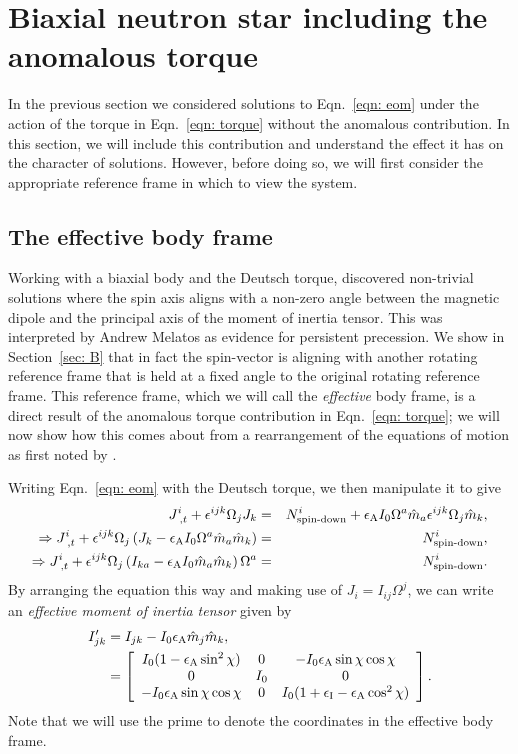 \documentclass[../full_thesis/full_thesis.tex]{subfiles}
\begin{document}
\section{Biaxial neutron star including the anomalous torque}
\label{sec: biaxial neutron star with anomalous torque}
In the previous section we considered solutions to Eqn.~\eqref{eqn: eom}
under the action of the torque in Eqn.~\eqref{eqn: torque} without the
anomalous contribution. In this section, we will include this contribution and
understand the effect it has on the character of solutions. However, before
doing so, we will first consider the appropriate reference frame in which to
view the system.

\subsection{The effective body frame}
\label{sec: effective body frame}
Working with a biaxial body and the Deutsch torque, \cite{Melatos2000}
discovered non-trivial solutions where the spin axis aligns with a non-zero
angle between the magnetic dipole and the principal axis of the moment of
inertia tensor.  This was
interpreted by Andrew Melatos as evidence for persistent precession. We show in
Section~\ref{sec: B} that in fact the spin-vector is aligning with another
rotating reference frame that is held at a fixed angle to the original rotating
reference frame. This reference frame, which we will call the \emph{effective} body
frame, is a direct result of the anomalous torque contribution in
Eqn.~\eqref{eqn: torque}; we will now show how this comes about from a
rearrangement of the equations of motion as first noted by \citet{Glampedakis2010}.

Writing Eqn.~\eqref{eqn: eom} with the Deutsch torque, we then manipulate it to
give
\begin{eqnarray}
J^{i}_{\;,t}+\epsilon^{ijk}\Omega_{j}J_{k} & =
& N^{i}_{\textrm{spin-down}}+
\epsilon_{\mathrm{A}} I_{0}\Omega^{a}\hat{m}_{a}\epsilon^{ijk}\Omega_{j}\hat{m}_{k}, \\
\Rightarrow J^{i}_{\;,t}+
\epsilon^{ijk}\Omega_{j}\left(J_{k}-\epsilon_{\mathrm{A}} I_{0}\Omega^{a}\hat{m}_{a}\hat{m}_{k}\right)
& = & N^{i}_{\textrm{spin-down}}, \\
\Rightarrow J^{i}_{\;,t}+
\epsilon^{ijk}\Omega_{j}\left(I_{ka}-\epsilon_{\mathrm{A}} I_{0}\hat{m}_{a}\hat{m}_{k}\right)\Omega^{a}
& = & N^{i}_{\textrm{spin-down}}.
\end{eqnarray}
By arranging the equation this way and making use of $J_{i}=I_{ij}\Omega^{j}$,
we can write an \emph{effective moment of inertia tensor} given by
\begin{align}
I'_{jk}&=I_{jk}-I_{0}\epsilon_{\mathrm{A}}\hat{m}_{j}\hat{m}_{k}, \\
&= \left[
\begin{array}{ccc}
I_{0}(1-\epsilon_{\mathrm{A}}\sin^{2}\chi) & 0 & -I_{0}\epsilon_{\mathrm{A}}\sin\chi \cos \chi \\
0 & I_{0} & 0 \\  -I_{0}\epsilon_{\mathrm{A}}\sin\chi \cos \chi& 0 &
I_{0}(1+\epsilon_{\mathrm{I}}-\epsilon_{\mathrm{A}}\cos^{2}\chi)
\end{array}
\right].
\label{eqn: effective MOI}
\end{align}
Note that we will use the prime to denote the coordinates in the
effective body frame.
\end{document}
